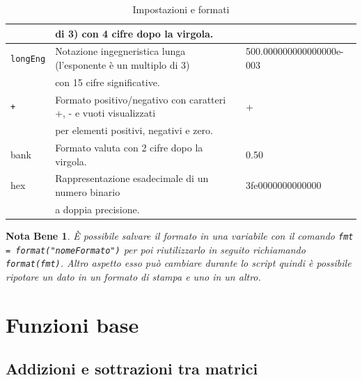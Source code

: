 \documentclass{book}
\newtheorem{notab}{Nota Bene}[section]
\begin{document}
\begin{table}[ht]
\begin{tabular}{lll}
               &di 3) con 4 cifre dopo la virgola.\\\hline
    \lstinline|longEng| & Notazione ingegneristica lunga (l'esponente è un multiplo di 3) & 500.000000000000000e-003\\ & con 15 cifre significative.\\\hline
    \lstinline|+|&Formato positivo/negativo con caratteri +, - e vuoti visualizzati & +\\
               & per elementi positivi, negativi e zero.\\\hline
    bank & Formato valuta con 2 cifre dopo la virgola. & 0.50 \\\hline
    hex & Rappresentazione esadecimale di un numero binario & 3fe0000000000000 \\
               & a doppia precisione.\\\hline 
  \end{tabular}
  \caption{Impostazioni e formati}
  \label{tab:form}
\end{table}
\begin{notab}
  È possibile salvare il formato in una variabile con il comando \lstinline|fmt = format("nomeFormato")|
  per poi riutilizzarlo in seguito richiamando \lstinline|format(fmt)|. Altro aspetto esso può cambiare durante lo script quindi è possibile ripotare un dato
  in un formato di stampa e uno in un altro.
\end{notab}
\chapter{Funzioni base}
\label{chap:funbase}

\section{Addizioni e sottrazioni tra matrici}
\label{sec:addesottmtx}
\end{document}
